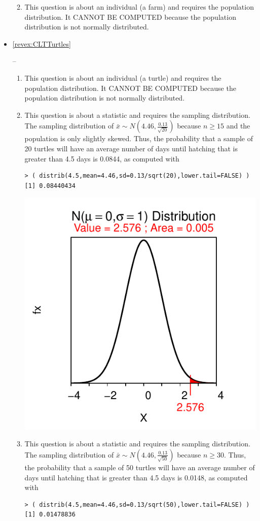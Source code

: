 \documentclass[10pt,openany]{book}\usepackage[]{graphicx}\usepackage[]{color}
\makeatletter
\newenvironment{kframe}{%
 \def\at@end@of@kframe{}%
 \ifinner\ifhmode%
  \def\at@end@of@kframe{\end{minipage}}%
  \begin{minipage}{\columnwidth}%
 \fi\fi%
 \def\FrameCommand##1{\hskip\@totalleftmargin \hskip-\fboxsep
 \colorbox{shadecolor}{##1}\hskip-\fboxsep
     \hskip-\linewidth \hskip-\@totalleftmargin \hskip\columnwidth}%
 \MakeFramed {\advance\hsize-\width
   \@totalleftmargin\z@ \linewidth\hsize
   \@setminipage}}%
 {\par\unskip\endMakeFramed%
 \at@end@of@kframe}
\newenvironment{knitrout}{}{} %
\makeatother
\begin{document}
\begin{itemize}
\begin{enumerate}
\begin{knitrout}
\end{knitrout}
       \item This question is about an individual (a farm) and requires the population distribution. It CANNOT BE COMPUTED because the population distribution is not normally distributed.
    \end{enumerate}
  \item \hypertarget{ans:CLTTurtles}{\ref{revex:CLTTurtles}} --
    \begin{enumerate}
       \item This question is about an individual (a turtle) and requires the population distribution. It CANNOT BE COMPUTED because the population distribution is not normally distributed.
       \item This question is about a statistic and requires the sampling distribution.  The sampling distribution of $\bar{x}\sim N(4.46,\frac{0.13}{\sqrt{20}})$ because $n \geq 15$ and the population is only slightly skewed.  Thus, the probability that a sample of 20 turtles will have an average number of days until hatching that is greater than 4.5 days is 0.0844, as computed with
\begin{knitrout}
\color{fgcolor}\begin{kframe}
\begin{verbatim}
> ( distrib(4.5,mean=4.46,sd=0.13/sqrt(20),lower.tail=FALSE) )
[1] 0.08440434
\end{verbatim}
\end{kframe}

{\centering \includegraphics[width=.4\linewidth]{Figs/unnamed-chunk-327-1} 

}



\end{knitrout}
       \item This question is about a statistic and requires the sampling distribution.  The sampling distribution of $\bar{x}\sim N(4.46,\frac{0.13}{\sqrt{50}})$ because $n \geq 30$.  Thus, the probability that a sample of 50 turtles will have an average number of days until hatching that is greater than 4.5 days is 0.0148, as computed with
\begin{knitrout}
\color{fgcolor}\begin{kframe}
\begin{verbatim}
> ( distrib(4.5,mean=4.46,sd=0.13/sqrt(50),lower.tail=FALSE) )
[1] 0.01478836
\end{verbatim}
\end{kframe}


\end{knitrout}
\end{enumerate}
\end{itemize}
\end{document}

